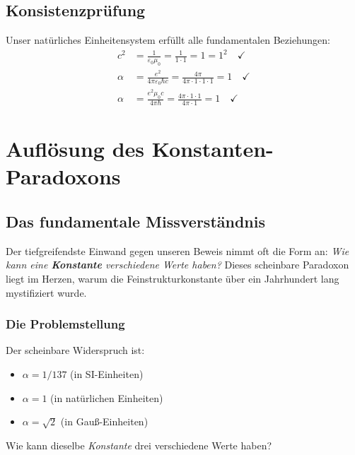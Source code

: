 \documentclass[12pt,a4paper]{article}
\newcommand{\alphaem}{\alpha}
\begin{document}
	\subsection{Konsistenzprüfung}
	
	\begin{tcolorbox}[colback=blue!5!white,colframe=blue!75!black,title=Interne Konsistenzverifikation]
		Unser natürliches Einheitensystem erfüllt alle fundamentalen Beziehungen:
		\begin{align}
			c^2 &= \frac{1}{\varepsilon_0\mu_0} = \frac{1}{1 \cdot 1} = 1 = 1^2 \quad \checkmark\\
			\alphaem &= \frac{e^2}{4\pi\varepsilon_0\hbar c} = \frac{4\pi}{4\pi \cdot 1 \cdot 1 \cdot 1} = 1 \quad \checkmark\\
			\alphaem &= \frac{e^2\mu_0 c}{4\pi\hbar} = \frac{4\pi \cdot 1 \cdot 1}{4\pi \cdot 1} = 1 \quad \checkmark
		\end{align}
	\end{tcolorbox}
	
	\section{Auflösung des Konstanten-Paradoxons}
	
	\subsection{Das fundamentale Missverständnis}
	
	Der tiefgreifendste Einwand gegen unseren Beweis nimmt oft die Form an: \textit{Wie kann eine \textbf{Konstante} verschiedene Werte haben?} Dieses scheinbare Paradoxon liegt im Herzen, warum die Feinstrukturkonstante über ein Jahrhundert lang mystifiziert wurde.
	
	\subsubsection{Die Problemstellung}
	
	Der scheinbare Widerspruch ist:
	\begin{itemize}
		\item $\alpha = 1/137$ (in SI-Einheiten)
		\item $\alpha = 1$ (in natürlichen Einheiten)
		\item $\alpha = \sqrt{2}$ (in Gauß-Einheiten)
	\end{itemize}
	
	Wie kann dieselbe \textit{Konstante} drei verschiedene Werte haben?
	
\end{document}
